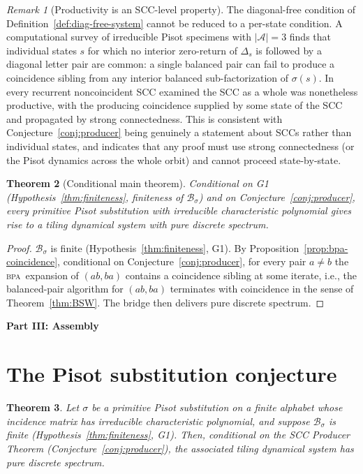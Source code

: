 \documentclass[11pt]{article}
\theoremstyle{plain}
\newtheorem{theorem}{Theorem}[section]
\theoremstyle{definition}
\theoremstyle{remark}
\newtheorem{remark}[theorem]{Remark}
\newcommand{\BPA}{\textsc{bpa}}
\newcommand{\PDS}{pure discrete spectrum}
\newcommand{\A}{\mathcal{A}}
\newcommand{\B}{\mathcal{B}}
\begin{document}
\begin{remark}[Productivity is an SCC-level property]\label{rem:scc-level}
The diagonal-free condition of Definition~\ref{def:diag-free-system} cannot be reduced to a per-state condition. A computational survey of irreducible Pisot specimens with $|\A|=3$ finds that individual states $s$ for which no interior zero-return of $\Delta_s$ is followed by a diagonal letter pair are common: a single balanced pair can fail to produce a coincidence sibling from any interior balanced sub-factorization of $\sigma(s)$. In every recurrent noncoincident SCC examined the SCC as a whole was nonetheless productive, with the producing coincidence supplied by some state of the SCC and propagated by strong connectedness. This is consistent with Conjecture~\ref{conj:producer} being genuinely a statement about SCCs rather than individual states, and indicates that any proof must use strong connectedness (or the Pisot dynamics across the whole orbit) and cannot proceed state-by-state.
\end{remark}

\begin{theorem}[Conditional main theorem]\label{thm:cond-main}
Conditional on G1 (Hypothesis~\ref{thm:finiteness}, finiteness of $\B_\sigma$) and on Conjecture~\ref{conj:producer}, every primitive Pisot substitution with irreducible characteristic polynomial gives rise to a tiling dynamical system with \PDS.
\end{theorem}

\begin{proof}
$\B_\sigma$ is finite (Hypothesis~\ref{thm:finiteness}, G1). By Proposition~\ref{prop:bpa-coincidence}, conditional on Conjecture~\ref{conj:producer}, for every pair $a\ne b$ the \BPA\ expansion of $(ab,ba)$ contains a coincidence sibling at some iterate, i.e., the balanced-pair algorithm for $(ab,ba)$ terminates with coincidence in the sense of Theorem~\ref{thm:BSW}. The bridge then delivers \PDS.
\end{proof}

\begin{center}\textbf{Part III: Assembly}\end{center}

\section{The Pisot substitution conjecture}\label{sec:assembly}

\begin{theorem}\label{thm:main}
Let $\sigma$ be a primitive Pisot substitution on a finite alphabet whose incidence matrix has irreducible characteristic polynomial, and suppose $\B_\sigma$ is finite \textup{(Hypothesis~\ref{thm:finiteness}, G1)}. Then, conditional on the SCC Producer Theorem (Conjecture~\ref{conj:producer}), the associated tiling dynamical system has \PDS.
\end{theorem}
\end{document}
